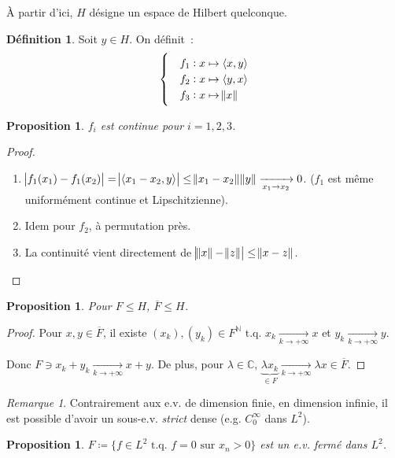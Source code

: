 \documentclass{report}
\newcommand{\C}{{\mathbb C}}
\newcommand{\N}{{\mathbb N}}
\newcommand{\scpr}[2]{\left\langle#1, #2\right\rangle}
\newcommand{\tq}{\text{ t.q. }}
\newcommand{\pinfty}{{+\infty}}
\newtheorem{prp}[thm]{Proposition}
\theoremstyle{definition}
\newtheorem{déf}[thm]{Définition}
\theoremstyle{remark}
\newtheorem*{rmq}{Remarque}
\begin{document}
À partir d'ici, $H$ désigne un espace de Hilbert quelconque.

\begin{déf} Soit $y \in H$. On définit~:
\[\begin{cases}
	&f_1 : x \mapsto \scpr xy \\
	&f_2 : x \mapsto \scpr yx \\
	&f_3 : x \mapsto \norm x
\end{cases}\]
\end{déf}

\begin{prp} $f_i$ est continue pour $i=1,2,3$.
\end{prp}

\begin{proof}
\begin{enumerate}
	\item $\abs {f_1(x_1) - f_1(x_2)} = \abs {\scpr {x_1-x_2}y} \leq \norm {x_1-x_2}\norm y \xrightarrow[x_1 \to x_2]{} 0$. ($f_1$ est même uniformément continue et Lipschitzienne).
	\item Idem pour $f_2$, à permutation près.
	\item La continuité vient directement de $\abs {\norm x-\norm z} \leq \norm {x-z}$.
\end{enumerate}
\end{proof}

\begin{prp} Pour $F \leq H$, $\overline F \leq H$.
\end{prp}

\begin{proof} Pour $x, y \in \overline F$, il existe $(x_k), (y_k) \in F^\N \tq x_k \xrightarrow[k \to \pinfty]{} x$ et $y_k \xrightarrow[k \to \pinfty]{} y$.

Donc $F \ni x_k+y_k \xrightarrow[k \to \pinfty]{} x+y$.
De plus, pour $\lambda \in \C$, $\underbrace {\lambda x_k}_{\in F} \xrightarrow[k \to \pinfty]{} \lambda x \in \overline F$.
\end{proof}

\begin{rmq} Contrairement aux e.v. de dimension finie, en dimension infinie, il est possible d'avoir un sous-e.v. \textit{strict} dense (e.g. $C^\infty_0$ dans $L^2$).
\end{rmq}

\begin{prp} $F \coloneqq \{f \in L^2 \tq f=0 \text{ sur } x_n > 0\}$ est un e.v. fermé dans $L^2$.
\end{prp}
\end{document}
